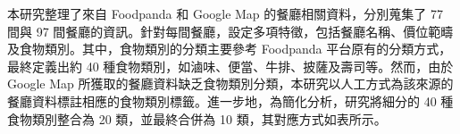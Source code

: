         本研究整理了來自 Foodpanda 和 Google Map 的餐廳相關資料，分別蒐集了 77 間與 97 間餐廳的資訊。針對每間餐廳，設定多項特徵，包括餐廳名稱、價位範疇及食物類別。其中，食物類別的分類主要參考 Foodpanda 平台原有的分類方式，最終定義出約 40 種食物類別，如滷味、便當、牛排、披薩及壽司等。然而，由於 Google Map 所獲取的餐廳資料缺乏食物類別分類，本研究以人工方式為該來源的餐廳資料標註相應的食物類別標籤。進一步地，為簡化分析，研究將細分的 40 種食物類別整合為 20 類，並最終合併為 10 類，其對應方式如表所示。
        
\color{black}